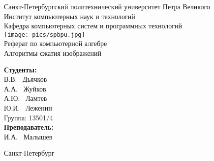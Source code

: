 \begin{titlepage}	%

	\begin{center}		%

		\large Санкт-Петербургский политехнический университет Петра Великого\\
		\large Институт компьютерных наук и технологий \\
		\large Кафедра компьютерных систем и программных технологий\\[1cm]
		
		\texttt{[image: pics/spbpu.jpg]}\\[2cm]
		
		\huge Реферат по компьютерной алгебре\\[0.5cm] %
		\huge Алгоритмы сжатия изображений\\[7cm]

	\end{center}	
	
	\begin{flushright} %
		\begin{minipage}{0.25\textwidth} %
			\begin{flushleft} %

				\large\textbf{Студенты:}\\
				\large В.В. ~Дьячков\\
				\large А.А. ~Жуйков\\
				\large А.Ю. ~Ламтев\\
				\large Ю.И. ~Леженин\\
				\large {Группа:} 13501/4\\
				
				\large \textbf{Преподаватель:}\\
				\large И.А. ~Малышев\\

			\end{flushleft}
		\end{minipage}
	\end{flushright}
	
	\vfill %

	\begin{center}
	\large Санкт-Петербург\\
	\large \the\year %
	\end{center} %
\thispagestyle{empty} %
\end{titlepage} %

\vfill %
